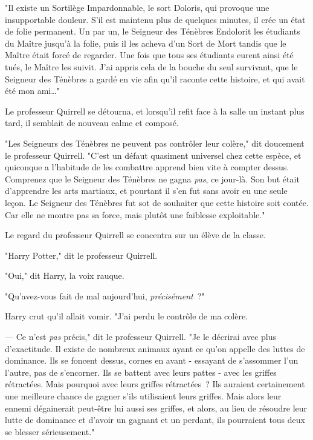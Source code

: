 "Il existe un Sortilège Impardonnable, le sort Doloris, qui provoque une insupportable douleur. S'il est maintenu plus de quelques minutes, il crée un état de folie permanent. Un par un, le Seigneur des Ténèbres Endolorit les étudiants du Maître jusqu'à la folie, puis il les acheva d'un Sort de Mort tandis que le Maître était forcé de regarder. Une fois que tous ses étudiants eurent ainsi été tués, le Maître les suivit. J'ai appris cela de la bouche du seul survivant, que le Seigneur des Ténèbres a gardé en vie afin qu'il raconte cette histoire, et qui avait été mon ami…"

Le professeur Quirrell se détourna, et lorsqu'il refit face à la salle un instant plus tard, il semblait de nouveau calme et composé.

"Les Seigneurs des Ténèbres ne peuvent pas contrôler leur colère," dit doucement le professeur Quirrell. "C'est un défaut quasiment universel chez cette espèce, et quiconque a l'habitude de les combattre apprend bien vite à compter dessus. Comprenez que le Seigneur des Ténèbres ne gagna \emph{pas}, ce jour-là. Son but était d'apprendre les arts martiaux, et pourtant il s'en fut sans avoir eu une seule leçon. Le Seigneur des Ténèbres fut sot de souhaiter que cette histoire soit contée. Car elle ne montre pas sa force, mais plutôt une faiblesse exploitable."

Le regard du professeur Quirrell se concentra sur un élève de la classe.

"Harry Potter," dit le professeur Quirrell.

"Oui," dit Harry, la voix rauque.

"Qu'avez-vous fait de mal aujourd'hui, \emph{précisément}~?"

Harry crut qu'il allait vomir. "J'ai perdu le contrôle de ma colère.

--- Ce n'est \emph{pas} précis," dit le professeur Quirrell. "Je le décrirai avec plus d'exactitude. Il existe de nombreux animaux ayant ce qu'on appelle des luttes de dominance. Ils se foncent dessus, cornes en avant - essayant de s'assommer l'un l'autre, pas de s'encorner. Ils se battent avec leurs pattes - avec les griffes rétractées. Mais pourquoi avec leurs griffes rétractées~? Ils auraient certainement une meilleure chance de gagner s'ils utilisaient leurs griffes. Mais alors leur ennemi dégainerait peut-être lui aussi ses griffes, et alors, au lieu de résoudre leur lutte de dominance et d'avoir un gagnant et un perdant, ils pourraient tous deux se blesser sérieusement."


